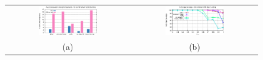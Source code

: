 \ifdefined\noauthorea
\begin{figure}[!ht]
\begin{center}
\begin{tabular}{cc}
\hspace{-6mm}
\includegraphics[width=0.49\textwidth]{figures/hcct-bursting/hcct-bursting-accuracy.eps} &
\includegraphics[width=0.49\textwidth]{figures/hcct-bursting/hcct-bursting-coverage.eps}\\
(a) & (b)
\end{tabular}
\caption{\protect}
\end{center}
\end{figure}
\fi
